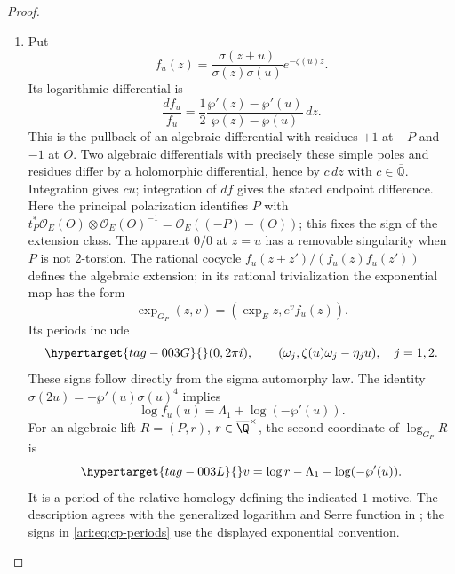 \begin{proof}
\begin{enumerate}[label=\arabic*.,leftmargin=*]
\item Put
\[
 f_u(z)=\frac{\sigma(z+u)}{\sigma(z)\sigma(u)}e^{-\zeta(u)z}.
\]
Its logarithmic differential is
\[
 \frac{df_u}{f_u}
 =\frac12\frac{\wp'(z)-\wp'(u)}{\wp(z)-\wp(u)}\,dz.
\]
This is the pullback of an algebraic differential with residues
$+1$ at $-P$ and $-1$ at $O$.
Two algebraic differentials with precisely these simple poles
and residues differ by a holomorphic differential, hence by
$c\,dz$ with $c\in\overline{\mathbb Q}$.
Integration gives $cu$; integration of $df$ gives the stated
endpoint difference.
Here the principal polarization identifies $P$ with
$t_P^*\mathcal O_E(O)\otimes\mathcal O_E(O)^{-1}
=\mathcal O_E((-P)-(O))$; this fixes the sign of the extension class. The apparent $0/0$ at $z=u$
has a removable singularity when $P$ is not $2$-torsion.
The rational cocycle $f_u(z+z')/(f_u(z)f_u(z'))$ defines
the algebraic extension; in its rational trivialization the
exponential map has the form
\[
 \exp_{G_P}(z,v)=(\exp_E z,e^v f_u(z)).
\]
Its periods include
\begin{equation}\hypertarget{tag-003G}{}\label{ari:eq:cp-periods}
 (0,2\pi i),\qquad
 (\omega_j,\zeta(u)\omega_j-\eta_j u),\quad j=1,2.
\end{equation}
These signs follow directly from the sigma automorphy law.
The identity
$\sigma(2u)=-\wp'(u)\sigma(u)^4$ implies
\[
 \log f_u(u)=\Lambda_1+\log(-\wp'(u)).
\]
For an algebraic lift $R=(P,r)$, $r\in\overline\Q^{\times}$,
the second coordinate of $\log_{G_P}R$ is
\begin{equation}\hypertarget{tag-003L}{}\label{ari:eq:cp-v}
 v=\log r-\Lambda_1-\log(-\wp'(u)).
\end{equation}
It is a period of the relative homology defining the indicated
$1$-motive.
The description agrees with the generalized logarithm and
Serre function in \citet[Section~2.3, equations~(2.10)--(2.13), pp.~7--8;
Definitions~2.3--2.4, p.~8; Section~6.1, pp.~26--27,
arXiv v2]{bertolin2022}; the signs in
\eqref{ari:eq:cp-periods} use the displayed exponential convention.
\end{enumerate}
\end{proof}